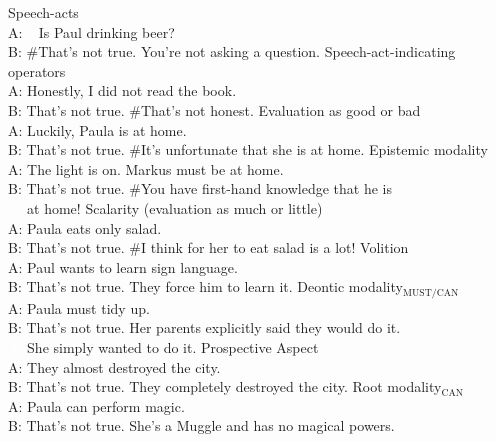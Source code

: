 \begin{exe}
\ex\label{goodandbaddiscourse}
\begin{xlist}
						\ex Speech-acts \label{goodandbaddiscoursezweo} \\
								A: \textcolor{white}{\#}Is Paul drinking beer? \\
								B: \#That's not true. You're not asking a question.
								\ex Speech-act-indicating operators \label{goodandbaddiscoursea} \\
								A: Honestly, I did not read the book. \\
								B: That's not true. \#That's not honest.
								 \ex Evaluation as good or bad \label{goodandbaddiscourseb}\\
								A: Luckily, Paula is at home. \\
								B: That's not true. \#It's unfortunate that she is at home.
						\ex Epistemic modality \label{goodandbaddiscoursec}\\
								A: The light is on. Markus must be at home. \\
								B: That's not true. \#You have first-hand knowledge that he is \\
								\textcolor{white}{A: }at home!
						\ex Scalarity (evaluation as much or little) \label{goodandbaddiscoursed} \\
								A: Paula eats only salad. \label{goodandbaddiscoursee} \\
								B: That's not true. \#I think for her to eat salad is a lot!
						\ex Volition \\
								A: Paul wants to learn sign language. \label{goodandbaddiscourseehans}\\
								B: That's not true. They force him to learn it.
            \ex Deontic modality$_{\textrm{MUST/CAN}}$ \label{goodandbaddiscourseehansensbeispiel} \\
								A: Paula must tidy up. \\
								B: That's not true. Her parents explicitly said they would do it.\\
								\textcolor{white}{A: }She simply wanted to do it.
						\ex Prospective Aspect \label{goodandbaddiscourseehansensbeispielb} \\
								A: They almost destroyed the city. \\
								B: That's not true. They completely destroyed the city.
						\ex Root modality$_{\textrm{CAN}}$ \label{goodandbaddiscourseg} \\
								A: Paula can perform magic. \\
								B: That's not true. She's a Muggle and has no magical powers.
\end{xlist}
\end{exe}

